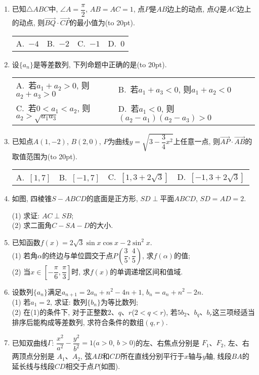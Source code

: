 \documentclass[10pt,a4paper]{article}
\newcommand{\bracket}[1]{(\hbox to #1pt{})}
\newcommand{\twoch}[4]{\par\begin{tabular}{p{.46\textwidth}p{.46\textwidth}}
A.~#1& B.~#2\\
C.~#3& D.~#4
\end{tabular}}
\newcommand{\fourch}[4]{\par\begin{tabular}{p{.23\textwidth}p{.23\textwidth}p{.23\textwidth}p{.23\textwidth}}
A.~#1 &B.~#2& C.~#3& D.~#4
\end{tabular}}
\begin{document}
\begin{enumerate}[1.]
\fourch{充分非必要}{必要非充分}{充要}{既非充分又非必要}
\item 已知$\triangle ABC$中, $\angle A=\dfrac{\pi }2$, $AB=AC=1$, 点$P$是$AB$边上的动点, 点$Q$是$AC$边上的动点, 则$\overrightarrow{BQ}\cdot \overrightarrow{CP}$的最小值为\bracket{20}.
\fourch{$-4$}{$-2$}{$-1$}{$0$}
\item 设$\{a_n\}$是等差数列, 下列命题中正确的是\bracket{20}.
\twoch{若$a_1+a_2>0$, 则$a_2+a_3>0$}{若$a_1+a_3<0$, 则$a_1+a_2<0$}{若$0<a_1<a_2$, 则$a_2>\sqrt {a_1a_3}$}{若$a_1<0$, 则$(a_2-a_1)(a_2-a_3)>0$}
\item 已知点$A(1,-2)$, $B(2,0)$, $P$为曲线$y=\sqrt {3-\dfrac 34x^2}$上任意一点, 则$\overrightarrow{AP}\cdot \overrightarrow{AB}$的取值范围为\bracket{20}.
\fourch{$[1,7]$}{$[-1,7]$}{$[1,3+2\sqrt 3]$}{$[-1,3+2\sqrt 3]$}
\item 如图, 四棱锥$S-ABCD$的底面是正方形, $SD \perp$平面$ABCD$, $SD=AD=2$.
\begin{center}
\end{center}
(1) 求证: $AC\perp SB$;\\
(2) 求二面角$C-SA-D$的大小.
\item 已知函数$f(x)=2\sqrt 3\sin x\cos x-2\sin ^2x$.\\
(1) 若角$\alpha$的终边与单位圆交于点$P(\dfrac 35,\dfrac 45)$, 求$f(\alpha)$的值;\\
(2) 当$x\in [-\dfrac{\pi }6, \dfrac{\pi }3]$时, 求$f(x)$的单调递增区间和值域.
\item 设数列$\{a_n\}$满足$a_{n+1}=2a_n+n^2-4n+1$, $b_n=a_n+n^2-2n$.\\
(1) 若$a_1=2$, 求证: 数列$\{b_n\}$为等比数列;\\
(2) 在(1)的条件下, 对于正整数$2$、$q$、$r$($2<q<r$), 若$5b_2$、$b_q$、$b_r$这三项经适当排序后能构成等差数列, 求符合条件的数组$(q,r)$.
\item 已知双曲线$\Gamma$: $\dfrac{x^2}{a^2}-\dfrac{y^2}{b^2}=1$($a>0$, $b>0$)的左、右焦点分别是 $F_1$、$F_2$, 左、右两顶点分别是 $A_1$、$A_2$, 弦$AB$和$CD$所在直线分别平行于$x$轴与$y$轴, 线段$BA$的延长线与线段$CD$相交于点$P$(如图).
\begin{center}

\end{center}
\end{enumerate}
\end{document}
